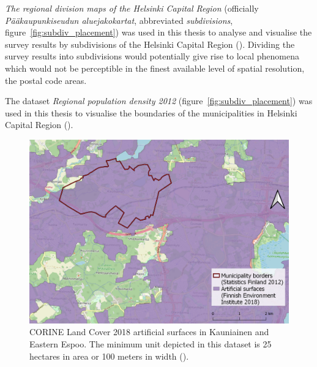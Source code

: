 \textit{The regional division maps of the Helsinki Capital Region} (officially \textit{Pääkaupunkiseudun aluejakokartat}, abbreviated \textit{subdivisions}, figure~\ref{fig:subdiv_placement}) was used in this thesis to analyse and visualise the survey results by subdivisions of the Helsinki Capital Region (\cite{HelsinginEspoonVantaanjaKauniaistenmittausorganisaatiot2011}). Dividing the survey results into subdivisions would potentially give rise to local phenomena which would not be perceptible in the finest available level of spatial resolution, the postal code areas.

The dataset \textit{Regional population density 2012} (figure~\ref{fig:subdiv_placement}) was used in this thesis to visualise the boundaries of the municipalities in Helsinki Capital Region (\cite{StatisticsFinland2012}). 

\newpage
\begin{figure}[H]%
    \centering
    \includegraphics[width=.88\textwidth]{images/thesis_data_artificial.png}
    \caption[CORINE Land Cover 2018 artificial surfaces in Kauniainen and Eastern Espoo.]{CORINE Land Cover 2018 artificial surfaces in Kauniainen and Eastern Espoo. The minimum unit depicted in this dataset is 25 hectares in area or 100 meters in width (\cite{OpenStreetMap}).}%
    \label{fig:datalayers_corine}%
\end{figure}

